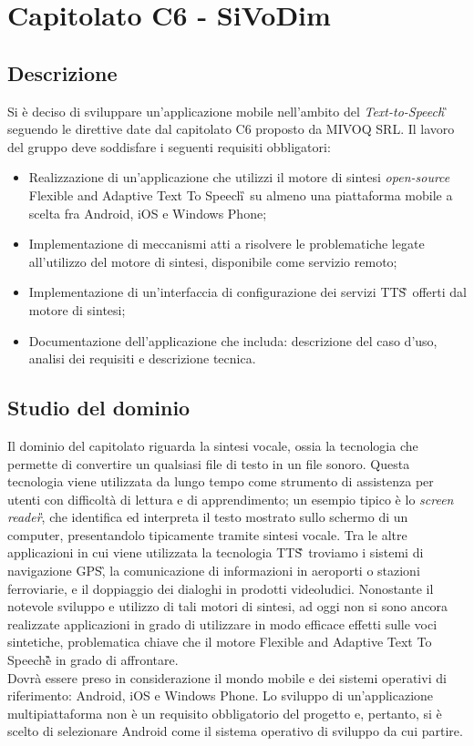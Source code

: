 \section{Capitolato C6 - SiVoDim}
\subsection{Descrizione}
Si è deciso di sviluppare un'applicazione mobile nell'ambito del \textit{Text-to-Speech\G\,} seguendo le direttive date dal capitolato C6 proposto da MIVOQ SRL. Il lavoro del gruppo deve soddisfare i seguenti requisiti obbligatori:
\begin{itemize}
\item Realizzazione di un'applicazione che utilizzi il motore di sintesi \textit{open-source} Flexible and Adaptive Text To Speech\G\, su almeno una piattaforma mobile a scelta fra Android, iOS e Windows Phone;
\item Implementazione di meccanismi atti a risolvere le problematiche legate all’utilizzo del motore di sintesi, disponibile come servizio remoto;
\item Implementazione di un'interfaccia di configurazione dei servizi TTS\G\, offerti dal motore di sintesi;
\item Documentazione dell'applicazione che includa: descrizione del caso d'uso, analisi dei requisiti e descrizione tecnica.
\end{itemize}

\subsection{Studio del dominio}
Il dominio del capitolato riguarda la sintesi vocale, ossia la tecnologia che permette di convertire un qualsiasi file di testo in un file sonoro. Questa tecnologia viene utilizzata da lungo tempo come strumento di assistenza per utenti con difficoltà di lettura e di apprendimento; un esempio tipico è lo \textit{screen reader\G}, che identifica ed interpreta il testo mostrato sullo schermo di un computer, presentandolo tipicamente tramite sintesi vocale. Tra le altre applicazioni in cui viene utilizzata la tecnologia TTS\G\, troviamo i sistemi di navigazione GPS\G, la comunicazione di informazioni in aeroporti o stazioni ferroviarie, e il doppiaggio dei dialoghi in prodotti videoludici. Nonostante il notevole sviluppo e utilizzo di tali motori di sintesi, ad oggi non si sono ancora realizzate applicazioni in grado di utilizzare in modo efficace effetti sulle voci sintetiche, problematica chiave che il motore Flexible and Adaptive Text To Speech\G è in grado di affrontare.\\
Dovrà essere preso in considerazione il mondo mobile e dei sistemi operativi di riferimento: Android, iOS e Windows Phone. Lo sviluppo di un'applicazione multipiattaforma non è un requisito obbligatorio del progetto e, pertanto, si è scelto di selezionare Android come il sistema operativo di sviluppo da cui partire.

